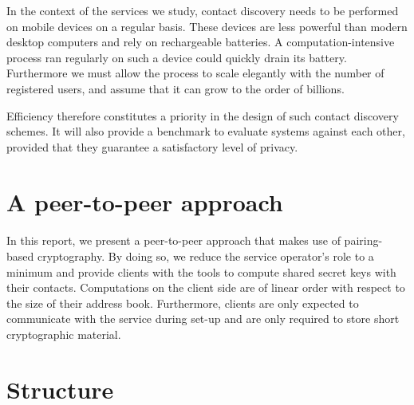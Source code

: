 In the context of the services we study, contact discovery needs to be performed on mobile devices on a regular basis. These devices are less powerful than modern desktop computers and rely on rechargeable batteries. A computation-intensive process ran regularly on such a device could quickly drain its battery. Furthermore we must allow the process to scale elegantly with the number of registered users, and assume that it can grow to the order of billions.

Efficiency therefore constitutes a priority in the design of such contact discovery schemes. It will also provide a benchmark to evaluate systems against each other, provided that they guarantee a satisfactory level of privacy.




%


\section{A peer-to-peer approach}

\paragraph{} In this report, we present a peer-to-peer approach that makes use of pairing-based cryptography. By doing so, we reduce the service operator's role to a minimum and provide clients with the tools to compute shared secret keys with their contacts. Computations on the client side are of linear order with respect to the size of their address book. Furthermore, clients are only expected to communicate with the service during set-up and are only required to store short cryptographic material.



\section{Structure}





























